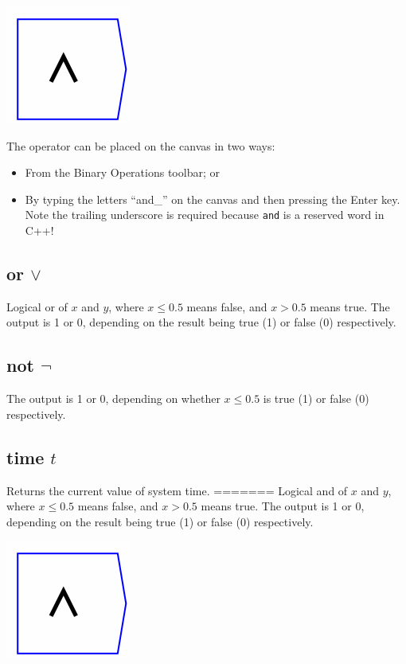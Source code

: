 \includegraphics{images/andkey.png} 

The operator can be placed on the canvas in two ways:

\begin{itemize}
\item From the Binary Operations toolbar; or
\item By typing the letters ``and\_'' on the canvas and then pressing
  the Enter key. Note the trailing underscore is required because
  \verb+and+ is a reserved word in C++!
\end{itemize}


\subsection{or $\vee$}\label{Operation:or_} Logical or of $x$ and $y$,
where $x\le0.5$ means false, and $x>0.5$ means true. The output is 1
or 0, depending on the result being true (1) or false (0)
respectively.

\subsection{not $\neg$}\label{Operation:not_} The output is 1 or 0,
depending
on whether $x\le0.5$ is true (1) or false (0) respectively.

\subsection{time $t$}\label{Operation:time} Returns the current value
of system time.
=======
\label{Operation:and_} Logical and of $x$ and $y$, where $x\le0.5$
means false, and $x>0.5$ means true. The output is 1 or 0, depending
on the result being true (1) or false (0) respectively.

\includegraphics{images/andkey}

